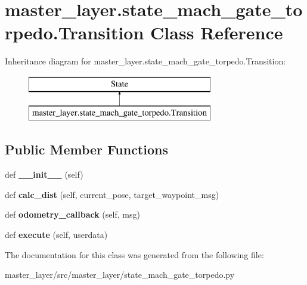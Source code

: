 \hypertarget{classmaster__layer_1_1state__mach__gate__torpedo_1_1Transition}{}\section{master\+\_\+layer.\+state\+\_\+mach\+\_\+gate\+\_\+torpedo.\+Transition Class Reference}
\label{classmaster__layer_1_1state__mach__gate__torpedo_1_1Transition}
Inheritance diagram for master\+\_\+layer.\+state\+\_\+mach\+\_\+gate\+\_\+torpedo.\+Transition\+:\begin{figure}[H]
\begin{center}
\leavevmode
\includegraphics[height=2.000000cm]{classmaster__layer_1_1state__mach__gate__torpedo_1_1Transition}
\end{center}
\end{figure}
\subsection*{Public Member Functions}
\begin{DoxyCompactItemize}
\item 
\mbox{\label{classmaster__layer_1_1state__mach__gate__torpedo_1_1Transition_a31b00037ee6c96787791f885ed3e000e}} 
def {\bfseries \+\_\+\+\_\+init\+\_\+\+\_\+} (self)
\item 
\mbox{\label{classmaster__layer_1_1state__mach__gate__torpedo_1_1Transition_ab57ba0a2861b978ad946d9ec06a34530}} 
def {\bfseries calc\+\_\+dist} (self, current\+\_\+pose, target\+\_\+waypoint\+\_\+msg)
\item 
\mbox{\label{classmaster__layer_1_1state__mach__gate__torpedo_1_1Transition_a622947c971ae0e84130c7773cc7fbf59}} 
def {\bfseries odometry\+\_\+callback} (self, msg)
\item 
\mbox{\label{classmaster__layer_1_1state__mach__gate__torpedo_1_1Transition_a2820be36b5d38e0bc5ee3e2a3efe5b2d}} 
def {\bfseries execute} (self, userdata)
\end{DoxyCompactItemize}


The documentation for this class was generated from the following file\+:\begin{DoxyCompactItemize}
\item 
master\+\_\+layer/src/master\+\_\+layer/state\+\_\+mach\+\_\+gate\+\_\+torpedo.\+py\end{DoxyCompactItemize}
